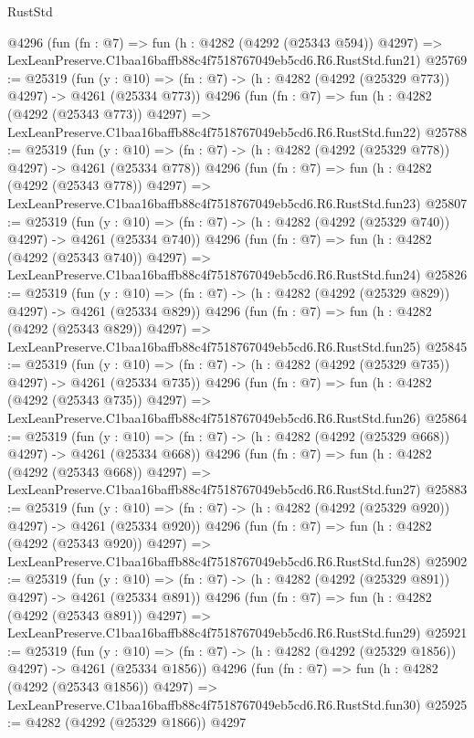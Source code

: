 \begin{lexlean}{RustStd}
\begin{coremodule}
    @4296
    (fun (fn : @7) =>
    fun (h : @4282 (@4292 (@25343 @594)) @4297) =>
    LexLeanPreserve.C1baa16baffb88c4f7518767049eb5cd6.R6.RustStd.fun21)
@25769 := @25319
    (fun (y : @10) => (fn : @7) -> (h : @4282 (@4292 (@25329 @773)) @4297) -> @4261 (@25334 @773))
    @4296
    (fun (fn : @7) =>
    fun (h : @4282 (@4292 (@25343 @773)) @4297) =>
    LexLeanPreserve.C1baa16baffb88c4f7518767049eb5cd6.R6.RustStd.fun22)
@25788 := @25319
    (fun (y : @10) => (fn : @7) -> (h : @4282 (@4292 (@25329 @778)) @4297) -> @4261 (@25334 @778))
    @4296
    (fun (fn : @7) =>
    fun (h : @4282 (@4292 (@25343 @778)) @4297) =>
    LexLeanPreserve.C1baa16baffb88c4f7518767049eb5cd6.R6.RustStd.fun23)
@25807 := @25319
    (fun (y : @10) => (fn : @7) -> (h : @4282 (@4292 (@25329 @740)) @4297) -> @4261 (@25334 @740))
    @4296
    (fun (fn : @7) =>
    fun (h : @4282 (@4292 (@25343 @740)) @4297) =>
    LexLeanPreserve.C1baa16baffb88c4f7518767049eb5cd6.R6.RustStd.fun24)
@25826 := @25319
    (fun (y : @10) => (fn : @7) -> (h : @4282 (@4292 (@25329 @829)) @4297) -> @4261 (@25334 @829))
    @4296
    (fun (fn : @7) =>
    fun (h : @4282 (@4292 (@25343 @829)) @4297) =>
    LexLeanPreserve.C1baa16baffb88c4f7518767049eb5cd6.R6.RustStd.fun25)
@25845 := @25319
    (fun (y : @10) => (fn : @7) -> (h : @4282 (@4292 (@25329 @735)) @4297) -> @4261 (@25334 @735))
    @4296
    (fun (fn : @7) =>
    fun (h : @4282 (@4292 (@25343 @735)) @4297) =>
    LexLeanPreserve.C1baa16baffb88c4f7518767049eb5cd6.R6.RustStd.fun26)
@25864 := @25319
    (fun (y : @10) => (fn : @7) -> (h : @4282 (@4292 (@25329 @668)) @4297) -> @4261 (@25334 @668))
    @4296
    (fun (fn : @7) =>
    fun (h : @4282 (@4292 (@25343 @668)) @4297) =>
    LexLeanPreserve.C1baa16baffb88c4f7518767049eb5cd6.R6.RustStd.fun27)
@25883 := @25319
    (fun (y : @10) => (fn : @7) -> (h : @4282 (@4292 (@25329 @920)) @4297) -> @4261 (@25334 @920))
    @4296
    (fun (fn : @7) =>
    fun (h : @4282 (@4292 (@25343 @920)) @4297) =>
    LexLeanPreserve.C1baa16baffb88c4f7518767049eb5cd6.R6.RustStd.fun28)
@25902 := @25319
    (fun (y : @10) => (fn : @7) -> (h : @4282 (@4292 (@25329 @891)) @4297) -> @4261 (@25334 @891))
    @4296
    (fun (fn : @7) =>
    fun (h : @4282 (@4292 (@25343 @891)) @4297) =>
    LexLeanPreserve.C1baa16baffb88c4f7518767049eb5cd6.R6.RustStd.fun29)
@25921 := @25319
    (fun (y : @10) => (fn : @7) -> (h : @4282 (@4292 (@25329 @1856)) @4297) -> @4261 (@25334 @1856))
    @4296
    (fun (fn : @7) =>
    fun (h : @4282 (@4292 (@25343 @1856)) @4297) =>
    LexLeanPreserve.C1baa16baffb88c4f7518767049eb5cd6.R6.RustStd.fun30)
@25925 := @4282 (@4292 (@25329 @1866)) @4297

\end{coremodule}
\end{lexlean}
